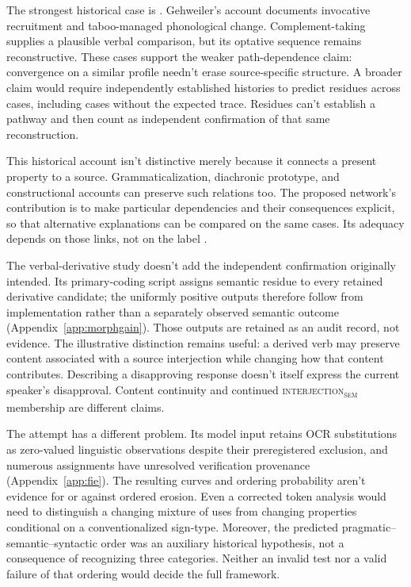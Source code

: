 \documentclass[12pt]{article}
\newcommand{\intj}[1]{\textsc{interjection\textsubscript{#1}}}
\begin{document}
The strongest historical case is . Gehweiler's account documents invocative recruitment and taboo-managed phonological change. Complement-taking  supplies a plausible verbal comparison, but its optative sequence remains reconstructive. These cases support the weaker path-dependence claim: convergence on a similar profile needn't erase source-specific structure. A broader claim would require independently established histories to predict residues across cases, including cases without the expected trace. Residues can't establish a pathway and then count as independent confirmation of that same reconstruction.

This historical account isn't distinctive merely because it connects a present property to a source. Grammaticalization, diachronic prototype, and constructional accounts can preserve such relations too. The proposed network's contribution is to make particular dependencies and their consequences explicit, so that alternative explanations can be compared on the same cases. Its adequacy depends on those links, not on the label .

The verbal-derivative study doesn't add the independent confirmation originally intended. Its primary-coding script assigns semantic residue to every retained derivative candidate; the uniformly positive outputs therefore follow from implementation rather than a separately observed semantic outcome (Appendix~\ref{app:morphgain}). Those outputs are retained as an audit record, not evidence. The illustrative distinction remains useful: a derived verb may preserve content associated with a source interjection while changing how that content contributes. Describing a disapproving response doesn't itself express the current speaker's disapproval. Content continuity and continued \intj{sem} membership are different claims.

The  attempt has a different problem. Its model input retains OCR substitutions as zero-valued linguistic observations despite their preregistered exclusion, and numerous assignments have unresolved verification provenance (Appendix~\ref{app:fie}). The resulting curves and ordering probability aren't evidence for or against ordered erosion. Even a corrected token analysis would need to distinguish a changing mixture of uses from changing properties conditional on a conventionalized sign-type. Moreover, the predicted pragmatic--semantic--syntactic order was an auxiliary historical hypothesis, not a consequence of recognizing three categories. Neither an invalid test nor a valid failure of that ordering would decide the full framework.
\end{document}
